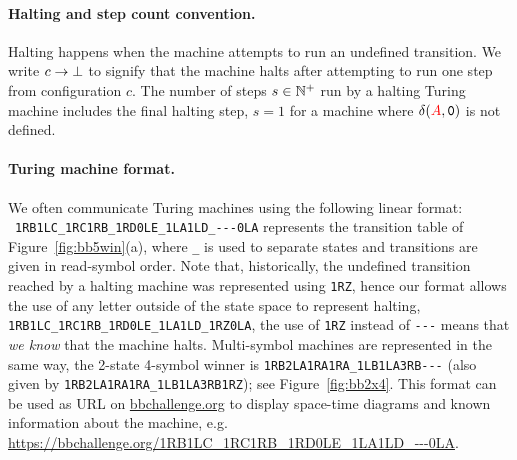 \vspace{-1ex}
\paragraph{Halting and step count convention.} Halting happens when the machine attempts to run an undefined transition. We write $c \to \bot$ to signify that the machine halts after attempting to run one step from configuration $c$. The number of steps $s\in \mathbb{N}^+$ run by a halting Turing machine includes the final halting step, \eg $s = 1$ for a machine where $\delta(\stateA,\symbolzero)$ is not defined.



\vspace{-1ex}
\paragraph*{Turing machine format.} We often communicate Turing machines using the following linear format: \\ \verb|1RB1LC_1RC1RB_1RD0LE_1LA1LD_---0LA| represents the transition table of Figure~\ref{fig:bb5win}(a), where \texttt{\_} is used to separate states and transitions are given in read-symbol order. Note that, historically, the undefined transition reached by a halting machine was represented using \texttt{1RZ}, hence our format allows the use of any letter outside of the state space to represent halting, \eg \texttt{1RB1LC\_1RC1RB\_1RD0LE\_1LA1LD\_1RZ0LA}, the use of \texttt{1RZ} instead of \verb|---| means that \textit{we know} that the machine halts. Multi-symbol machines are represented in the same way, \eg the 2-state 4-symbol \BBfull winner is \verb|1RB2LA1RA1RA_1LB1LA3RB---| (also given by \texttt{1RB2LA1RA1RA\_1LB1LA3RB1RZ}); see Figure~\ref{fig:bb2x4}. This format can be used as URL on \url{bbchallenge.org} to display space-time diagrams and known information about the machine, e.g. \url{https://bbchallenge.org/1RB1LC\_1RC1RB\_1RD0LE\_1LA1LD\_---0LA}.


